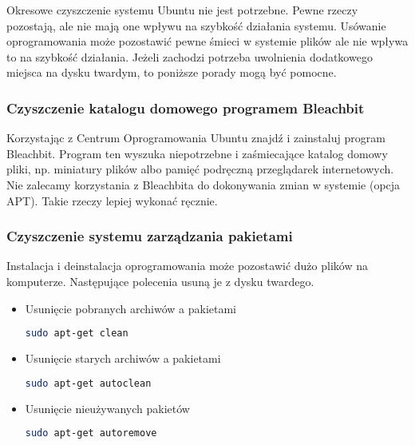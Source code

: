 Okresowe czyszczenie systemu Ubuntu nie jest potrzebne. Pewne rzeczy pozostają, ale nie mają one wpływu na szybkość działania systemu. Usówanie oprogramowania może pozostawić pewne śmieci w systemie plików ale nie wpływa to na szybkość działania. Jeżeli zachodzi potrzeba uwolnienia dodatkowego miejsca na dysku twardym, to poniższe porady mogą być pomocne.

\subsubsection{Czyszczenie katalogu domowego programem Bleachbit}
Korzystając z Centrum Oprogramowania Ubuntu znajdź i zainstaluj program \textcolor{ubuntu_orange}{Bleachbit}. Program ten wyszuka niepotrzebne i zaśmiecające katalog domowy pliki, np. miniatury plików albo pamięć podręczną przeglądarek internetowych. Nie zalecamy korzystania z Bleachbita do dokonywania zmian w systemie (opcja APT). Takie rzeczy lepiej wykonać ręcznie.

\subsubsection{Czyszczenie systemu zarządzania pakietami}
Instalacja i deinstalacja oprogramowania może pozostawić dużo plików na komputerze. Następujące polecenia usuną je z dysku twardego.
\begin{itemize}
\item Usunięcie pobranych archiwów a pakietami
\begin{lstlisting}[language=bash]
sudo apt-get clean
\end{lstlisting}
\item Usunięcie starych archiwów a pakietami
\begin{lstlisting}[language=bash]
sudo apt-get autoclean
\end{lstlisting}
\item Usunięcie nieużywanych pakietów
\begin{lstlisting}[language=bash]
sudo apt-get autoremove
\end{lstlisting}
\end{itemize}

